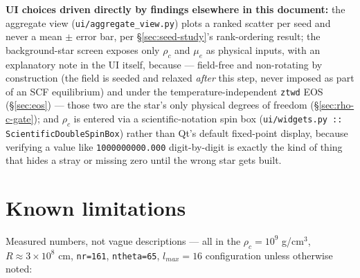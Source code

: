 \documentclass[11pt,a4paper]{scrartcl}
\newcommand{\code}[1]{\texttt{\small #1}}
\begin{document}
\textbf{UI choices driven directly by findings elsewhere in this
document:} the aggregate view (\code{ui/aggregate\_view.py}) plots a
ranked scatter per seed and never a mean $\pm$ error bar, per
\S\ref{sec:seed-study}'s rank-ordering result; the background-star
screen exposes only $\rho_c$ and $\mu_e$ as physical inputs, with an
explanatory note in the UI itself, because --- field-free and
non-rotating by construction (the field is seeded and relaxed
\emph{after} this step, never imposed as part of an SCF equilibrium)
and under the temperature-independent \code{ztwd} EOS (\S\ref{sec:eos})
--- those two are the star's only physical degrees of freedom
(\S\ref{sec:rho-c-gate}); and $\rho_c$ is entered via a
scientific-notation spin box (\code{ui/widgets.py ::
ScientificDoubleSpinBox}) rather than Qt's default fixed-point display,
because verifying a value like \code{1000000000.000} digit-by-digit is
exactly the kind of thing that hides a stray or missing zero until the
wrong star gets built.

\section{Known limitations}
\label{sec:limitacoes}

Measured numbers, not vague descriptions --- all in the $\rho_c=10^9$
g/cm$^3$, $R\approx3\times10^8$ cm, \code{nr=161}, \code{ntheta=65},
$l_{max}=16$ configuration unless otherwise noted:
\end{document}
